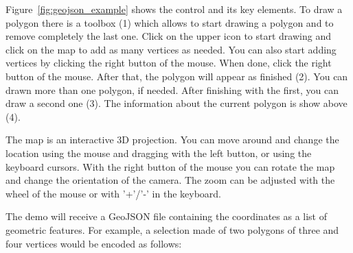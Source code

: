Figure~\ref{fig:geojson_example} shows the control and its key elements.
To draw a polygon there is a toolbox (1) which allows to start drawing a polygon and to remove completely the last one. Click on the upper icon to start drawing and click on the map to add as many vertices as needed. You can also start adding vertices by clicking the right button of the mouse. When done, click the right button of the mouse. After that, the polygon will appear as finished (2). You can drawn more than one polygon, if needed. After finishing with the first, you can draw a second one (3). The information about the current polygon is show above (4).

The map is an interactive 3D projection. You can move around and change the location using the mouse and dragging with the left button, or using the keyboard cursors. With the right button of the mouse you can rotate the map and change the orientation of the camera. The zoom can be adjusted with the wheel of the mouse or with '+'/'-' in the keyboard.

The demo will receive a GeoJSON file containing the coordinates as a list of geometric features.
For example, a selection made of two polygons of three and four vertices would be encoded as follows:

